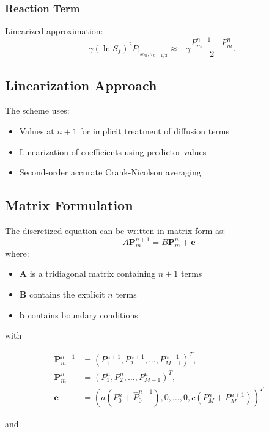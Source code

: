 \documentclass{article}
\begin{document}
\subsubsection{Reaction Term}
Linearized approximation:
\begin{equation}
-\gamma (\ln S_f)^2 P \big|_{x_m, \tau_{n+1/2}} \approx -\gamma \frac{P_m^{n+1} + P_m^n}{2}.
\end{equation}

\subsection{Linearization Approach}
The scheme uses:
\begin{itemize}
\item Values at $n+1$ for implicit treatment of diffusion terms
\item Linearization of coefficients using predictor values
\item Second-order accurate Crank-Nicolson averaging
\end{itemize}

\subsection{Matrix Formulation}
The discretized equation can be written in matrix form as:
\begin{equation}
A\bm{P}_{m}^{n+1} = B\bm{P}_{m}^{n} + \bm{e}
\end{equation}
where:
\begin{itemize}
\item $\mathbf{A}$ is a tridiagonal matrix containing $n+1$ terms
\item $\mathbf{B}$ contains the explicit $n$ terms
\item $\mathbf{b}$ contains boundary conditions
\end{itemize}


with

\begin{align}
\bm{P}_{m}^{n+1} &= \left( P_{1}^{n+1}, P_{2}^{n+1}, \ldots, P_{M-1}^{n+1} \right)^{T}, \\
\bm{P}_{m}^{n} &= \left( P_{1}^{n}, P_{2}^{n}, \ldots, P_{M-1}^{n} \right)^{T}, \\
\bm{e} &= \left( a \left( P_{0}^{n} + \hat{P}_{0}^{n+1} \right), 0, \ldots, 0, c \left( P_{M}^{n} + P_{M}^{n+1} \right) \right)^{T}
\end{align}

and
\end{document}
